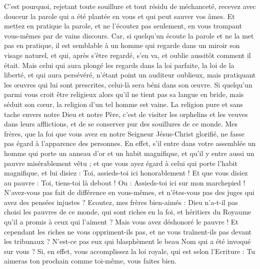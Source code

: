 \begin{multicols}{2}
C'est pourquoi, rejetant toute souillure et tout résidu de méchanceté, recevez avec douceur la parole qui a été plantée en vous et qui peut sauver vos âmes.
Et mettez en pratique la parole, et ne l'écoutez pas seulement, en vous trompant vous-mêmes par de vains discours.
Car, si quelqu'un écoute la parole et ne la met pas en pratique, il est semblable à un homme qui regarde dans un miroir son visage naturel,
et qui, après s'être regardé, s'en va, et oublie aussitôt comment il était.
Mais celui qui aura plongé les regards dans la loi parfaite, la loi de la liberté, et qui aura persévéré, n'étant point un auditeur oublieux, mais pratiquant les œuvres qui lui sont prescrites, celui-là sera béni dans son œuvre.
Si quelqu'un parmi vous croit être religieux alors qu'il ne tient pas sa langue en bride, mais séduit son cœur, la religion d'un tel homme est vaine.
La religion pure et sans tache envers notre Dieu et notre Père, c'est de visiter les orphelins et les veuves dans leurs afflictions, et de se conserver pur des souillures de ce monde.
\VerseOne{}Mes frères, que la foi que vous avez en notre Seigneur Jésus-Christ glorifié, ne fasse pas égard à l'apparence des personnes.
En effet, s'il entre dans votre assemblée un homme qui porte un anneau d'or et un habit magnifique, et qu'il y entre aussi un pauvre misérablement vêtu ;
et que vous ayez égard à celui qui porte l'habit magnifique, et lui disiez : Toi, assieds-toi ici honorablement ! Et que vous disiez au pauvre : Toi, tiens-toi là debout ! Ou : Assieds-toi ici sur mon marchepied !
N'avez-vous pas fait de différence en vous-mêmes, et n'êtes-vous pas des juges qui avez des pensées injustes ?
Ecoutez, mes frères bien-aimés : Dieu n'a-t-il pas choisi les pauvres de ce monde, qui sont riches en la foi, et héritiers du Royaume qu'il a promis à ceux qui l'aiment ?
Mais vous avez déshonoré le pauvre ! Et cependant les riches ne vous oppriment-ils pas, et ne vous traînent-ils pas devant les tribunaux ?
N'est-ce pas eux qui blasphèment le beau Nom qui a été invoqué sur vous ?
Si, en effet, vous accomplissez la loi royale, qui est selon l'Ecriture : Tu aimeras ton prochain comme toi-même, vous faites bien.

\end{multicols}
